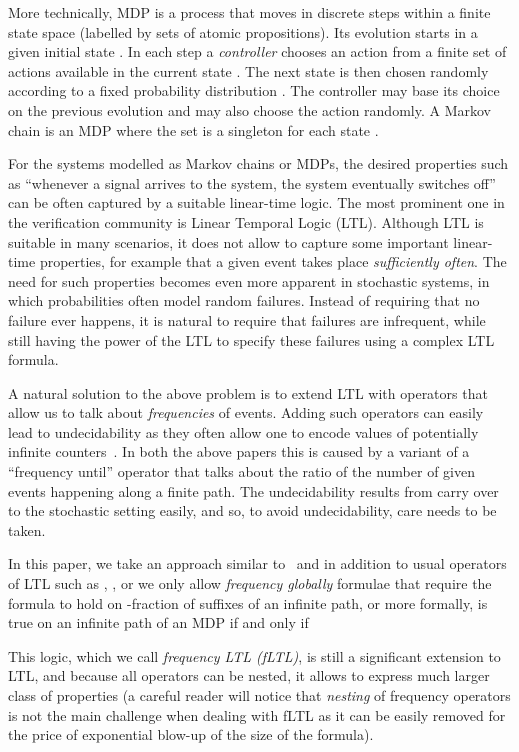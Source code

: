 \documentclass[a4paper,UKenglish]{lipics}
\begin{document}
More technically, MDP is a process that moves in discrete steps within a finite state space (labelled by sets of atomic propositions). Its evolution starts in a given initial state . In each step a \emph{controller} chooses an action  from a finite set  of actions available in the current state . The next state  is then chosen randomly according to a fixed probability distribution . The controller may base its choice on the previous evolution  and may also choose the action randomly. A Markov chain is an MDP where the set  is a singleton for each state .

For the systems modelled as Markov chains or MDPs, the desired properties such as ``whenever a signal arrives to the system, the system eventually switches off'' can be often captured by
a suitable linear-time logic. The most prominent one in the verification community is Linear Temporal Logic (LTL).
Although LTL is suitable in many scenarios, it does not allow to capture some important linear-time properties,
for example that a given event takes place {\em sufficiently often}.
The need for such properties becomes even more apparent in stochastic systems, in which probabilities often model random failures.
Instead of requiring that no failure ever happens, it is natural to require that failures are infrequent, while still having the power of the LTL to specify these failures using a complex LTL formula.

A natural solution to the above problem is to extend LTL with operators that allow us to talk about {\em frequencies} of events.
Adding such operators can easily lead to undecidability as they often allow one to encode
values of potentially infinite counters~\cite{BDL-tase12,BMM14}. In both the above papers this is caused by a variant of a ``frequency until'' operator
that talks about the ratio of the number of given events happening along a finite path. The undecidability results from \cite{BDL-tase12,BMM14} carry over to the stochastic setting easily, and so, to avoid undecidability, care needs to be taken.

In this paper, we take an approach similar to~\cite{AT12} and in addition to usual operators of LTL such as , ,  or  we only allow {\em frequency globally} formulae  that require the formula  to hold on -fraction of suffixes of an infinite path,
or more formally,  is true on an infinite path  of an MDP if and only if


This logic, which we call \emph{frequency LTL (fLTL)}, is still a significant extension to LTL, and because all operators can be nested, it allows to express much larger class of properties (a careful reader will notice that {\em nesting} of frequency operators is not the main challenge when dealing with fLTL as it can be easily removed for the price of exponential blow-up of the size of the formula).
\end{document}
